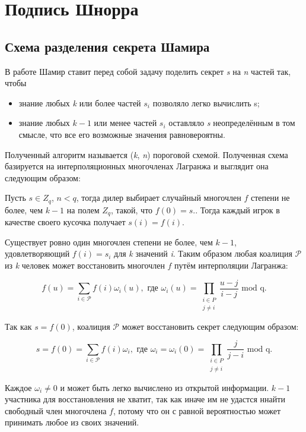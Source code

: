 \chapter{Подпись Шнорра}

\section{Схема разделения секрета Шамира}

В работе \cite{KG} Шамир ставит перед собой задачу поделить секрет \textit{s} на \textit{n} частей так, чтобы 
\begin{itemize}
    \item знание любых \textit{k} или более частей $s_i$ позволяло легко вычислить s;
    \item знание любых $k-1$ или менее частей $s_i$ оставляло \textit{s} неопределённым в том смысле, что все его возможные значения равновероятны.
\end{itemize}

Полученный алгоритм называется (\textit{k}, \textit{n}) пороговой схемой. Полученная схема базируется на интерполяционных многочленах Лагранжа и выглядит она следующим образом:

Пусть $s \in Z_q$, $n < q$, тогда дилер выбирает случайный многочлен $f$ степени не более, чем $k-1$ на полем $Z_q$, такой, что $f(0) = s.$. Тогда каждый игрок в качестве своего кусочка получает $s(i) = f(i)$.  

Существует ровно один многочлен степени не более, чем $k - 1$, удовлетворяющий $f(i) = s_i$ для \textit{k} значений \textit{i}. Таким образом любая коалиция $\mathcal{P}$ из \textit{k} человек может восстановить многочлен $f$ путём интерполяции Лагранжа:

$$ f(u) = \sum_{i \in \mathcal{P}}f(i)\omega_i(u), \text{ где } \omega_i(u) = \prod_{\substack{i \in P \\ j \neq i}} \frac{u - j}{i - j} \text{ mod q.} $$

Так как $s = f(0)$, коалиция $\mathcal{P}$ может восстановить секрет следующим образом:

$$ s = f(0) = \sum_{i\in\mathcal{P}}f(i)\omega_i, \text{ где } \omega_i = \omega_i(0) = \prod_{\substack{i \in P \\ j \neq i}} \frac{j}{j - i} \text{ mod q.}$$

Каждое $\omega_i \neq 0$ и может быть легко вычислено из открытой информации. $k - 1$ участника для восстановления не хватит, так как иначе им не удастся ннайти свободный член многочлена $f$, потому что он с равной вероятностью может принимать любое из своих значений.

